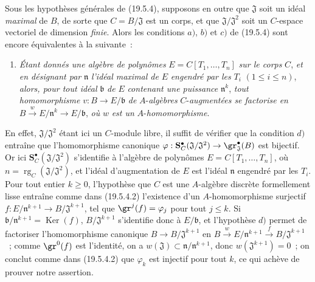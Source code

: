 \begin{remark}[19.5.5]
\label{0.19.5.5-fr}
Sous les hypothèses générales de (19.5.4), supposons en outre que
$\mathfrak J$ soit un idéal \emph{maximal} de $B$, de sorte que
$C=B/\mathfrak J$ est un corps, et que $\mathfrak J/\mathfrak J^2$ soit un
$C$-espace vectoriel de dimension \emph{finie}. Alors les conditions $a)$,
$b)$ et $c)$ de (19.5.4) sont encore équivalentes à la suivante~:
\begin{enumerate}
  \item[d)] \emph{Étant donnés une algèbre de polynômes}
  $E=C[T_1,\ldots,T_n]$ \emph{sur le corps} $C$, \emph{et en désignant par}
  $\mathfrak n$ \emph{l'idéal maximal de} $E$ \emph{engendré par les} $T_i$
  $(1\leq i\leq n)$, \emph{alors, pour tout idéal} $\mathfrak b$ \emph{de}
  $E$ \emph{contenant une puissance} $\mathfrak n^k$, \emph{tout
  homomorphisme} $v:B\to E/\mathfrak b$ \emph{de} $A$-\emph{algèbres}
  $C$-\emph{augmentées se factorise en}
  $B\xrightarrow{w}E/\mathfrak n^k\to E/\mathfrak b$, \emph{où} $w$ \emph{est
  un} $A$-\emph{homomorphisme}.
\end{enumerate}

En effet, $\mathfrak J/\mathfrak J^2$ étant ici un $C$-module libre, il suffit
de vérifier que la condition $d)$ entraîne que l'homomorphisme canonique
$\varphi:\mathbf S_C^\bullet(\mathfrak J/\mathfrak J^2)\to\gr_{\mathfrak J}^\bullet(B)$
est bijectif. Or ici $\mathbf S_C^\bullet(\mathfrak J/\mathfrak J^2)$ s'identifie à
l'algèbre de polynômes $E=C[T_1,\ldots,T_n]$, où
$n=\operatorname{rg}_C(\mathfrak J/\mathfrak J^2)$, et l'idéal d'augmentation
de $E$ est l'idéal $\mathfrak n$ engendré par les $T_i$. Pour tout entier
$k\geq0$, l'hypothèse que $C$ est une $A$-algèbre discrète formellement lisse
entraîne comme dans (19.5.4.2) l'existence d'un $A$-homomorphisme surjectif
$f:E/\mathfrak n^{k+1}\to B/\mathfrak J^{k+1}$, tel que
$\gr^j(f)=\varphi_j$ pour tout $j\leq k$. Si
$\mathfrak b/\mathfrak n^{k+1}=\operatorname{Ker}(f)$,
$B/\mathfrak J^{k+1}$ s'identifie donc à $E/\mathfrak b$, et l'hypothèse $d)$
permet de factoriser l'homomorphisme canonique $B\to B/\mathfrak J^{k+1}$ en
$B\xrightarrow{w}E/\mathfrak n^{k+1}\xrightarrow{f}B/\mathfrak J^{k+1}$~;
comme $\gr^0(f)$ est l'identité, on a
$w(\mathfrak J)\subset\mathfrak n/\mathfrak n^{k+1}$, donc
$w(\mathfrak J^{k+1})=0$~; on conclut comme dans (19.5.4.2) que $\varphi_k$
est injectif pour tout $k$, ce qui achève de prouver notre assertion.
\end{remark}

